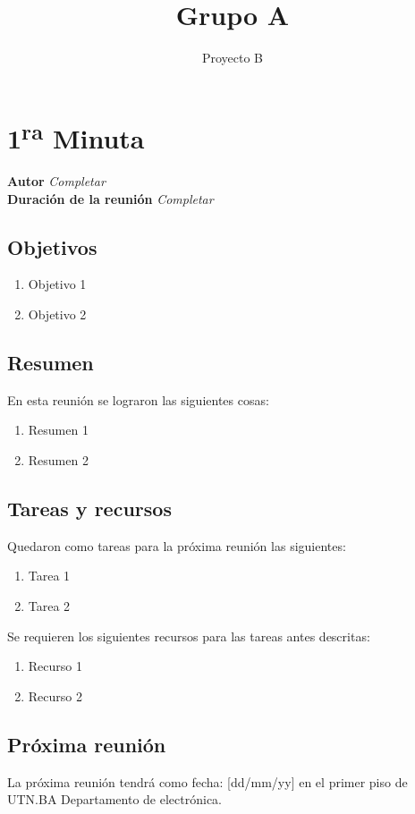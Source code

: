 \documentclass[a4paper]{article}
\title{Grupo A}
\author{Proyecto B}
\begin{document}
\maketitle

\section{1\textsuperscript{ra} Minuta}

		\textbf{Autor} \qquad \textit{Completar}
\\
		\textbf{Duración de la reunión} \qquad \textit{Completar}

\subsection{Objetivos}
	\begin{enumerate}
		\item Objetivo 1
		\item Objetivo 2
	\end{enumerate}
	
\subsection{Resumen}
En esta reunión se lograron las siguientes cosas:
\begin{enumerate}
	\item Resumen 1
	\item Resumen 2
\end{enumerate}

\subsection{Tareas y recursos}
Quedaron como tareas para la próxima reunión las siguientes:
	\begin{enumerate}
		\item Tarea 1
		\item Tarea 2
	\end{enumerate}
Se requieren los siguientes recursos para las tareas antes descritas:
	\begin{enumerate}
		\item Recurso 1
		\item Recurso 2
	\end{enumerate}    
    \subsection{Próxima reunión}
La próxima reunión tendrá como fecha: [dd/mm/yy] en el primer piso de UTN.BA Departamento de electrónica.
\end{document}
